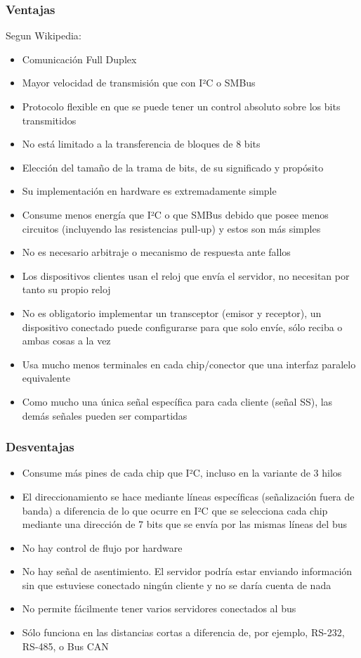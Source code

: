 \documentclass[../informe_krapp.tex]{subfiles}
\begin{document}
\subsubsection{Ventajas}
Segun Wikipedia\cite{wikipedia_spi}:
\begin{itemize}
	\item Comunicación Full Duplex
	\item Mayor velocidad de transmisión que con I²C o SMBus
	\item Protocolo flexible en que se puede tener un control absoluto sobre los bits transmitidos
	\item No está limitado a la transferencia de bloques de 8 bits
	\item Elección del tamaño de la trama de bits, de su significado y propósito
	\item Su implementación en hardware es extremadamente simple
	\item Consume menos energía que I²C o que SMBus debido que posee menos circuitos (incluyendo las resistencias pull-up) y estos son más simples
	\item No es necesario arbitraje o mecanismo de respuesta ante fallos
	\item Los dispositivos clientes usan el reloj que envía el servidor, no necesitan por tanto su propio reloj
	\item No es obligatorio implementar un transceptor (emisor y receptor), un dispositivo conectado puede configurarse para que solo envíe, sólo reciba o ambas cosas a la vez
	\item Usa mucho menos terminales en cada chip/conector que una interfaz paralelo equivalente
	\item Como mucho una única señal específica para cada cliente (señal SS), las demás señales pueden ser compartidas
\end{itemize}

\subsubsection{Desventajas}
\begin{itemize}
	\item Consume más pines de cada chip que I²C, incluso en la variante de 3 hilos
	\item El direccionamiento se hace mediante líneas específicas (señalización fuera de banda) a diferencia de lo que ocurre en I²C que se selecciona cada chip mediante una dirección de 7 bits que se envía por las mismas líneas del bus
	\item No hay control de flujo por hardware
	\item No hay señal de asentimiento. El servidor podría estar enviando información sin que estuviese conectado ningún cliente y no se daría cuenta de nada
	\item No permite fácilmente tener varios servidores conectados al bus
	\item Sólo funciona en las distancias cortas a diferencia de, por ejemplo, RS-232, RS-485, o Bus CAN
\end{itemize}
\end{document}

